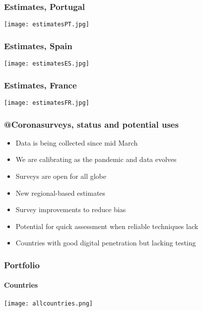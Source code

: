\documentclass{beamer}
\begin{document}
\begin{frame}
  \frametitle{Estimates, Portugal}
  \begin{center}
  \texttt{[image: estimatesPT.jpg]}
  \end{center}
\end{frame}

\begin{frame}
  \frametitle{Estimates, Spain}
  \begin{center}
  \texttt{[image: estimatesES.jpg]}
  \end{center}
\end{frame}

\begin{frame}
  \frametitle{Estimates, France}
  \begin{center}
  \texttt{[image: estimatesFR.jpg]}
  \end{center}
\end{frame}

\begin{frame}
  \frametitle{@Coronasurveys, status and potential uses}
  \begin{itemize}
    \item Data is being collected since mid March
    \item We are calibrating as the pandemic and data evolves
    \item Surveys are open for all globe
    \item New regional-based estimates
    \item Survey improvements to reduce bias
  \end{itemize}
  \begin{itemize}
    \item Potential for quick assessment when reliable techniques lack 
    \item Countries with good digital penetration but lacking testing
  \end{itemize}

\end{frame}

\begin{frame}
  \frametitle{Portfolio}
  \framesubtitle{Countries}
  \begin{center}
  \texttt{[image: allcountries.png]}
  \end{center}
\end{frame}

\end{document}
